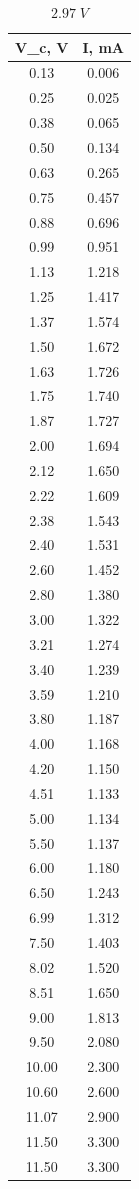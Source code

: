 \documentclass{article}
\begin{document}
\begin{table}[H]
\centering
\begin{tabular}{|c|c|}
\hline
V\_c, V & I, mA  \\\hline
0.13    & 0.006  \\\hline
0.25    & 0.025  \\\hline
0.38    & 0.065  \\\hline
0.50    & 0.134  \\\hline
0.63    & 0.265  \\\hline
0.75    & 0.457  \\\hline
0.88    & 0.696  \\\hline
0.99    & 0.951  \\\hline
1.13    & 1.218  \\\hline
1.25    & 1.417  \\\hline
1.37    & 1.574  \\\hline
1.50    & 1.672  \\\hline
1.63    & 1.726  \\\hline
1.75    & 1.740  \\\hline
1.87    & 1.727  \\\hline
2.00    & 1.694  \\\hline
2.12    & 1.650  \\\hline
2.22    & 1.609  \\\hline
2.38    & 1.543  \\\hline
2.40    & 1.531  \\\hline
2.60    & 1.452  \\\hline
2.80    & 1.380  \\\hline
3.00    & 1.322  \\\hline
3.21    & 1.274  \\\hline
3.40    & 1.239  \\\hline
3.59    & 1.210  \\\hline
3.80    & 1.187  \\\hline
4.00    & 1.168  \\\hline
4.20    & 1.150  \\\hline
4.51    & 1.133  \\\hline
5.00    & 1.134  \\\hline
5.50    & 1.137  \\\hline
6.00    & 1.180  \\\hline
6.50    & 1.243  \\\hline
6.99    & 1.312  \\\hline
7.50    & 1.403  \\\hline
8.02    & 1.520  \\\hline
8.51    & 1.650  \\\hline
9.00    & 1.813  \\\hline
9.50    & 2.080  \\\hline
10.00   & 2.300  \\\hline
10.60   & 2.600  \\\hline
11.07   & 2.900  \\\hline
11.50   & 3.300  \\\hline
11.50   & 3.300  \\\hline
\end{tabular}
\caption{\(2.97\;V\)}
\end{table}
\end{document}

